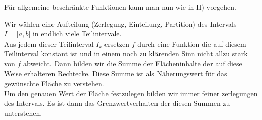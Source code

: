 \begin{enumerate}[\indent I)]
\begin{center}
\begin{tikzpicture}
\end{tikzpicture}
\end{center}

Für allgemeine beschränkte Funktionen kann man nun wie in II) vorgehen.

\begin{center}
\end{center}

Wir wählen eine Aufteilung (Zerlegung, Einteilung, Partition) des Intervals $I=\lbrack a,b\rbrack$ in endlich viele Teilintervale. \\

Aus jedem dieser Teilinterval $I_k$ ersetzen $f$ durch eine Funktion die auf diesem Teilinterval konstant ist und in einem noch zu klärenden Sinn nicht allzu stark von $f$ abweicht. Dann bilden wir die Summe der Flächeninhalte der auf diese Weise erhalteren Rechtecke. Diese Summe ist als Näherungswert für das gewünschte Fläche zu verstehen. \\

Um den genauen Wert der Fläche festzulegen bilden wir immer feiner zerlegungen des Intervals. Es ist dann das Grenzwertverhalten der diesen Summen zu unterstehen. 
\end{enumerate}
